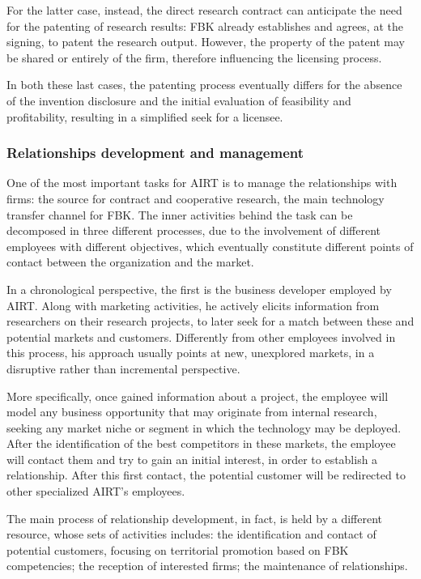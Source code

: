 For the latter case, instead, the direct research contract can anticipate the need for the patenting of research results: FBK already establishes and agrees, at the signing, to patent the research output. However, the property of the patent may be shared or entirely of the firm, therefore influencing the licensing process.

In both these last cases, the patenting process eventually differs for the absence of the invention disclosure and the initial evaluation of feasibility and profitability, resulting in a simplified seek for a licensee.

\subsubsection{Relationships development and management}

One of the most important tasks for AIRT is to manage the relationships with firms: the source for contract and cooperative research, the main technology transfer channel for FBK. The inner activities behind the task can be decomposed in three different processes, due to the involvement of different employees with different objectives, which eventually constitute different points of contact between the organization and the market.

In a chronological perspective, the first is the business developer employed by AIRT. Along with marketing activities, he actively elicits information from researchers on their research projects, to later seek for a match between these and potential markets and customers. Differently from other employees involved in this process, his approach usually points at new, unexplored markets, in a disruptive rather than incremental perspective. 

More specifically, once gained information about a project, the employee will model any business opportunity that may originate from internal research, seeking any market niche or segment in which the technology may be deployed. After the identification of the best competitors in these markets, the employee will contact them and try to gain an initial interest, in order to establish a relationship. After this first contact, the potential customer will be redirected to other specialized AIRT's employees. 

The main process of relationship development, in fact, is held by a different resource, whose sets of activities includes: the identification and contact of potential customers, focusing on territorial promotion based on FBK competencies; the reception of interested firms; the maintenance of relationships. 

